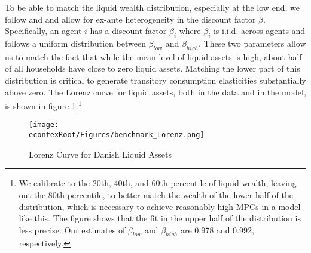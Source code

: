 \documentclass[titlepage]{\econtex}\newcommand{\texname}{ConsumptionHeterogeneity}
\begin{document}
 To be able to match the liquid wealth distribution, especially at the low end, we follow \cite{krusell_income_1998} and \cite{carroll_distribution_2017} and allow for ex-ante heterogeneity in the discount factor $\beta$. Specifically, an agent $i$ has a discount factor $\beta_i$ where $\beta_i$ is i.i.d. across agents and follows a uniform distribution between $\beta_{low}$ and $\beta_{high}$. These two parameters allow us to match the fact that while the mean level of liquid assets is high, about half of all households have close to zero liquid assets. Matching the lower part of this distribution is critical to generate transitory consumption elasticities substantially above zero. The Lorenz curve for liquid assets, both in the data and in the model, is shown in figure \ref{fig:Lorenz}.\footnote{We calibrate to the 20th, 40th, and 60th percentile of liquid wealth, leaving out the 80th percentile, to better match the wealth of the lower half of the distribution, which is necessary to achieve reasonably high MPCs in a model like this. The figure shows that the fit in the upper half of the distribution is less precise. Our estimates of $\beta_{low}$ and $\beta_{high}$ are 0.978 and 0.992, respectively.}
\begin{figure} 
		\centering
		\texttt{[image: \\econtexRoot/Figures/benchmark\_Lorenz.png]}
		\caption{Lorenz Curve for Danish Liquid Assets}
		\label{fig:Lorenz}
\end{figure}
\end{document}
